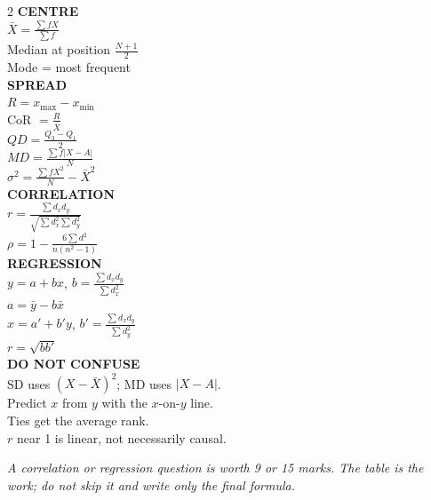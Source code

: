 \documentclass[11pt,a4paper]{article}
\begin{document}
\begin{multicols}{2}
\textbf{CENTRE}\\
$\bar X=\frac{\sum fX}{\sum f}$\\
Median at position $\frac{N+1}{2}$\\
Mode = most frequent\\[4pt]
\textbf{SPREAD}\\
$R=x_{\max}-x_{\min}$\\
CoR $=\frac{R}{\bar X}$\\
$QD=\frac{Q_3-Q_1}{2}$\\
$MD=\frac{\sum f|X-A|}{N}$\\
$\sigma^2=\frac{\sum fX^2}{N}-\bar X^2$\\[4pt]
\textbf{CORRELATION}\\
$r=\frac{\sum d_xd_y}{\sqrt{\sum d_x^2\sum d_y^2}}$\\
$\rho=1-\frac{6\sum d^2}{n(n^2-1)}$\\[4pt]
\textbf{REGRESSION}\\
$y=a+bx$, $b=\frac{\sum d_xd_y}{\sum d_x^2}$\\
$a=\bar y-b\bar x$\\
$x=a'+b'y$, $b'=\frac{\sum d_xd_y}{\sum d_y^2}$\\
$r=\sqrt{bb'}$\\[4pt]
\textbf{DO NOT CONFUSE}\\
SD uses $(X-\bar X)^2$; MD uses $|X-A|$.\\
Predict $x$ from $y$ with the $x$-on-$y$ line.\\
Ties get the average rank.\\
$r$ near 1 is linear, not necessarily causal.
\end{multicols}

\vfill
\begin{center}\textit{A correlation or regression question is worth 9 or 15 marks. The table is the work; do not skip it and write only the final formula.}\end{center}
\end{document}
